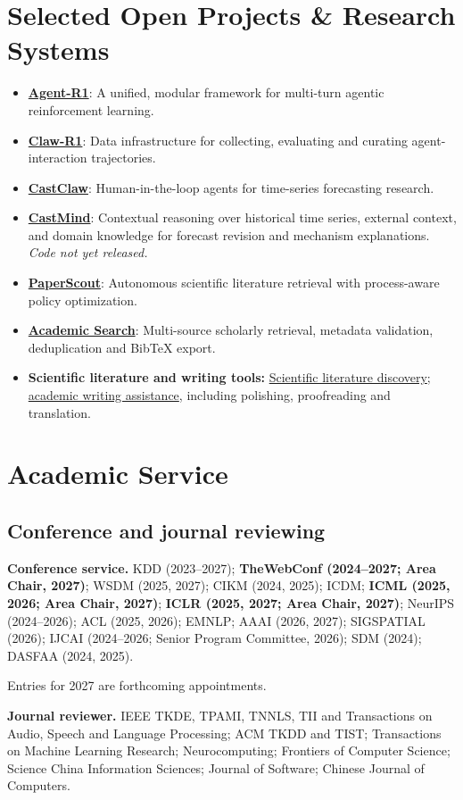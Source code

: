\documentclass[UTF8,fontset=fandol,scheme=plain,11pt,a4paper]{ctexart}
\newcommand{\system}[3]{\item \textbf{\href{#2}{#1}}: #3}
\begin{document}
\section{Selected Open Projects \& Research Systems}
\begin{itemize}[itemsep=4pt]
\system{Agent-R1}{https://github.com/AgentR1/Agent-R1}{A unified, modular framework for multi-turn agentic reinforcement learning.}
\system{Claw-R1}{https://github.com/AgentR1/Claw-R1}{Data infrastructure for collecting, evaluating and curating agent-interaction trajectories.}
\system{CastClaw}{https://ustc-time-series.github.io/cast-claw/}{Human-in-the-loop agents for time-series forecasting research.}
\system{CastMind}{https://github.com/ustc-time-series/CastMind}{Contextual reasoning over historical time series, external context, and domain knowledge for forecast revision and mechanism explanations. \textit{Code not yet released.}}
\system{PaperScout}{https://agentr1.github.io/paperscout/}{Autonomous scientific literature retrieval with process-aware policy optimization.}
\system{Academic Search}{https://github.com/ustc-ai4science/academic-search}{Multi-source scholarly retrieval, metadata validation, deduplication and BibTeX export.}
\item \textbf{Scientific literature and writing tools:} \href{https://lewen.bdaa.pro/}{Scientific literature discovery}; \href{https://writelearn.bdaa.pro/}{academic writing assistance}, including polishing, proofreading and translation.
\end{itemize}

\section{Academic Service}
\subsection{Conference and journal reviewing}
\textbf{Conference service.} KDD (2023--2027); \textbf{TheWebConf (2024--2027; Area Chair, 2027)}; WSDM (2025, 2027); CIKM (2024, 2025); ICDM; \textbf{ICML (2025, 2026; Area Chair, 2027)}; \textbf{ICLR (2025, 2027; Area Chair, 2027)}; NeurIPS (2024--2026); ACL (2025, 2026); EMNLP; AAAI (2026, 2027); SIGSPATIAL (2026); IJCAI (2024--2026; Senior Program Committee, 2026); SDM (2024); DASFAA (2024, 2025).

{\small\color{muted}Entries for 2027 are forthcoming appointments.}

\textbf{Journal reviewer.} IEEE TKDE, TPAMI, TNNLS, TII and Transactions on Audio, Speech and Language Processing; ACM TKDD and TIST; Transactions on Machine Learning Research; Neurocomputing; Frontiers of Computer Science; Science China Information Sciences; Journal of Software; Chinese Journal of Computers.
\end{document}
